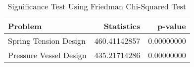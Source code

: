 \begin{table}
\centering
\caption{Significance Test Using Friedman Chi-Squared Test}
\label{friedman_test}
\begin{tabular}{lrr}
\toprule
               Problem &   Statistics &    p-value \\
\midrule
 Spring Tension Design & 460.41142857 & 0.00000000 \\
Pressure Vessel Design & 435.21714286 & 0.00000000 \\
\bottomrule
\end{tabular}
\end{table}

